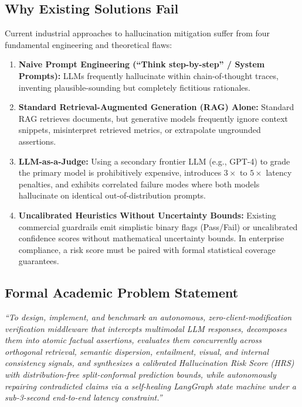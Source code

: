 \documentclass[11pt,a4paper]{article}
\begin{document}
\subsection{Why Existing Solutions Fail}
Current industrial approaches to hallucination mitigation suffer from four fundamental engineering and theoretical flaws:
\begin{enumerate}[leftmargin=*]
    \item \textbf{Naive Prompt Engineering (``Think step-by-step'' / System Prompts):} LLMs frequently hallucinate within chain-of-thought traces, inventing plausible-sounding but completely fictitious rationales.
    \item \textbf{Standard Retrieval-Augmented Generation (RAG) Alone:} Standard RAG retrieves documents, but generative models frequently ignore context snippets, misinterpret retrieved metrics, or extrapolate ungrounded assertions.
    \item \textbf{LLM-as-a-Judge:} Using a secondary frontier LLM (e.g., GPT-4) to grade the primary model is prohibitively expensive, introduces $3\times$ to $5\times$ latency penalties, and exhibits correlated failure modes where both models hallucinate on identical out-of-distribution prompts.
    \item \textbf{Uncalibrated Heuristics Without Uncertainty Bounds:} Existing commercial guardrails emit simplistic binary flags (Pass/Fail) or uncalibrated confidence scores without mathematical uncertainty bounds. In enterprise compliance, a risk score must be paired with formal statistical coverage guarantees.
\end{enumerate}

\subsection{Formal Academic Problem Statement}
\begin{tcolorbox}[colback=lightgreybg,colframe=primarynavy,title=\textbf{Formal Academic Problem Statement}]
\textit{``To design, implement, and benchmark an autonomous, zero-client-modification verification middleware that intercepts multimodal LLM responses, decomposes them into atomic factual assertions, evaluates them concurrently across orthogonal retrieval, semantic dispersion, entailment, visual, and internal consistency signals, and synthesizes a calibrated Hallucination Risk Score (HRS) with distribution-free split-conformal prediction bounds, while autonomously repairing contradicted claims via a self-healing LangGraph state machine under a sub-3-second end-to-end latency constraint.''}
\end{tcolorbox}
\end{document}
